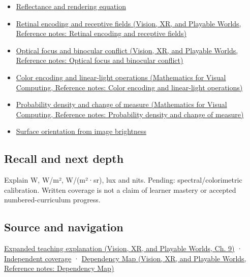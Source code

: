 \begin{itemize}
\tightlist
\item
  \hyperref[appendix-96da0b153b77]{Reflectance and rendering equation}
\item
  \href{../07-Vision-XR-and-Playable-Worlds/main.pdf\#nameddest=appendix-7281c15ac44a}{Retinal encoding and receptive fields (Vision, XR, and Playable Worlds, Reference notes: Retinal encoding and receptive fields)}
\item
  \href{../07-Vision-XR-and-Playable-Worlds/main.pdf\#nameddest=appendix-f90cee1be7a4}{Optical focus and binocular conflict (Vision, XR, and Playable Worlds, Reference notes: Optical focus and binocular conflict)}
\item
  \href{../02-Mathematics-for-Visual-Computing/main.pdf\#nameddest=appendix-a9f83ad40792}{Color encoding and linear-light operations (Mathematics for Visual Computing, Reference notes: Color encoding and linear-light operations)}
\item
  \href{../02-Mathematics-for-Visual-Computing/main.pdf\#nameddest=appendix-4815cd87ab8b}{Probability density and change of measure (Mathematics for Visual Computing, Reference notes: Probability density and change of measure)}
\item
  \hyperref[appendix-89b2d5b7c9e1]{Surface orientation from image brightness}
\end{itemize}

\subsection{Recall and next depth}\label{appendix-215c2570199b-recall-and-next-depth}

Explain W, W/m², W/(m²·sr), lux and nits. Pending: spectral/colorimetric calibration. Written coverage is not a claim of learner mastery or accepted numbered-curriculum progress.

\subsection{Source and navigation}\label{appendix-215c2570199b-source-and-navigation}

\href{../07-Vision-XR-and-Playable-Worlds/main.pdf\#nameddest=04-visual-computing-ii-ch042-light-must-become-a-quantity-before-it-becomes-a-color}{Expanded teaching explanation (Vision, XR, and Playable Worlds, Ch. 9)} · \hyperref[appendix-fd090d982a15-xr01---independent-seeing-and-representation-source]{Independent coverage} · \href{../07-Vision-XR-and-Playable-Worlds/main.pdf\#nameddest=appendix-4ad47bdd269a}{Dependency Map (Vision, XR, and Playable Worlds, Reference notes: Dependency Map)}

